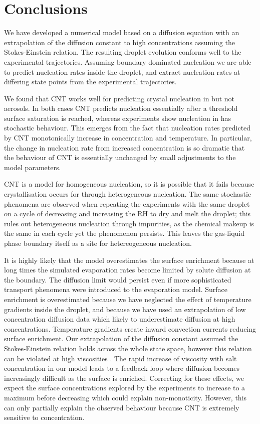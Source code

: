 \documentclass[11pt,twoside]{report}
\begin{document}
\section{Conclusions}

We have developed a numerical model based on a diffusion equation with an extrapolation of the diffusion constant to high concentrations assuming the Stokes-Einstein relation.
The resulting droplet evolution conforms well to the experimental trajectories.
Assuming boundary dominated nucleation we are able to predict nucleation rates inside the droplet, and extract nucleation rates at differing state points from the experimental trajectories.

We found that CNT works well for predicting crystal nucleation in  but not  aerosols.
In both cases CNT predicts nucleation essentially after a threshold surface saturation is reached, whereas experiments show nucleation in  has stochastic behaviour.
This emerges from the fact that nucleation rates predicted by CNT monotonically increase in concentration and temperature.
In particular, the change in nucleation rate from increased concentration is so dramatic that the behaviour of CNT is essentially unchanged by small adjustments to the model parameters.

CNT is a model for homogeneous nucleation, so it is possible that it fails because crystallisation occurs for  through heterogeneous nucleation.
The same stochastic phenomena are observed when repeating the experiments with the same droplet on a cycle of decreasing and increasing the RH to dry and melt the droplet; this rules out heterogeneous nucleation through impurities, as the chemical makeup is the same in each cycle yet the phenomenon persists.
This leaves the gas-liquid phase boundary itself as a site for hetereogeneous nucleation.

It is highly likely that the model overestimates the surface enrichment because at long times the simulated evaporation rates become limited by solute diffusion at the boundary.
The diffusion limit would persist even if more sophisticated transport phenomena were introduced to the evaporation model.
Surface enrichment is overestimated because we have neglected the effect of temperature gradients inside the droplet, and because we have used an extrapolation of low concentration diffusion data which likely to underestimate diffusion at high concentrations.
Temperature gradients create inward convection currents reducing surface enrichment.
Our extrapolation of the diffusion constant assumed the Stokes-Einstein relation holds across the whole state space, however this relation can be violated at high viscosities \cite{BerthierRMP2011}.
The rapid increase of viscosity with salt concentration in our model leads to a feedback loop where diffusion becomes increasingly difficult as the surface is enriched.
Correcting for these effects, we expect the surface concentrations explored by the experiments to increase to a maximum before decreasing which could explain non-monoticity.
However, this can only partially explain the observed behaviour because CNT is extremely sensitive to concentration.
\end{document}
